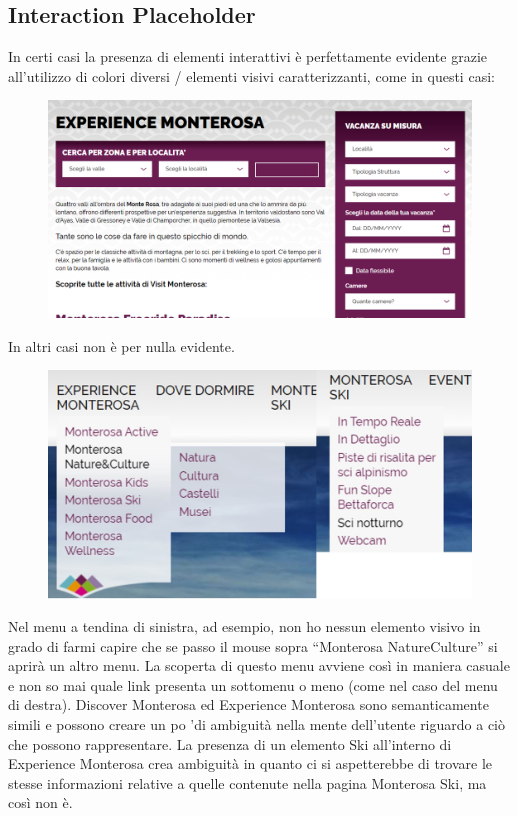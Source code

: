         \subsection{Interaction Placeholder}
        In certi casi la presenza di elementi interattivi è perfettamente
        evidente grazie all’utilizzo di colori diversi / elementi visivi
        caratterizzanti, come in questi casi:
        \begin{center}
            \begin{figure}[H]
                \includegraphics[scale=0.2]{resources/images/interactionPlaceholder1.png}
            \end{figure}
        \end{center}
        In altri casi non è per nulla evidente.
        \begin{center}
            \begin{figure}[H]
                \includegraphics[scale=0.3]{resources/images/interactionPlaceholderFinal.jpg}
            \end{figure}
        \end{center}
        Nel menu a tendina di sinistra, ad esempio, non ho nessun elemento visivo in
        grado di farmi capire che se passo il mouse sopra “Monterosa NatureCulture” si
        aprirà un altro menu. La scoperta di questo menu avviene così in maniera casuale
        e non so mai quale link presenta un sottomenu o meno (come nel caso del menu di destra).
        Discover Monterosa ed Experience Monterosa sono semanticamente simili e
        possono creare un po 'di ambiguità nella mente dell'utente riguardo a
        ciò che possono rappresentare.
        La presenza di un elemento Ski all'interno di Experience Monterosa crea
        ambiguità in quanto ci si aspetterebbe di trovare le stesse informazioni
        relative a quelle contenute nella pagina Monterosa Ski, ma così non è.
